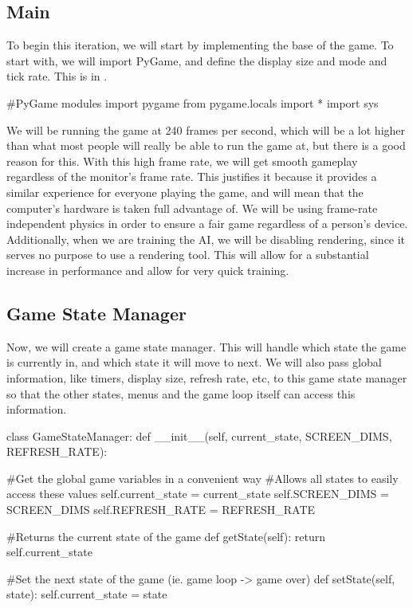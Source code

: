 \subsection{Main}

To begin this iteration, we will start by implementing the base of the game. To start with, we will import PyGame, and define the display size and mode and tick rate. This is in .
\vs

\begin{mpy}
#PyGame modules
import pygame
from pygame.locals import *
import sys
\end{mpy}

\vs
We will be running the game at 240 frames per second, which will be a lot higher than what most people will really be able to run the game at, but there is a good reason for this. With this high frame rate, we will get smooth gameplay regardless of the monitor's frame rate. This justifies it because it provides a similar experience for everyone playing the game, and will mean that the computer's hardware is taken full advantage of. We will be using frame-rate independent physics in order to ensure a fair game regardless of a person's device. Additionally, when we are training the AI, we will be disabling rendering, since it serves no purpose to use a rendering tool. This will allow for a substantial increase in performance and allow for very quick training.
\vs
\subsection{Game State Manager}

\vs
Now, we will create a game state manager. This will handle which state the game is currently in, and which state it will move to next. We will also pass global information, like timers, display size, refresh rate, etc, to this game state manager so that the other states, menus and the game loop itself can access this information.

\vs
\begin{mpy}
class GameStateManager:
    def __init__(self, current_state, SCREEN_DIMS, REFRESH_RATE):

        #Get the global game variables in a convenient way
        #Allows all states to easily access these values
        self.current_state = current_state
        self.SCREEN_DIMS = SCREEN_DIMS
        self.REFRESH_RATE = REFRESH_RATE

    #Returns the current state of the game
    def getState(self):
        return self.current_state

    #Set the next state of the game (ie. game loop -> game over)
    def setState(self, state):
        self.current_state = state
\end{mpy}

